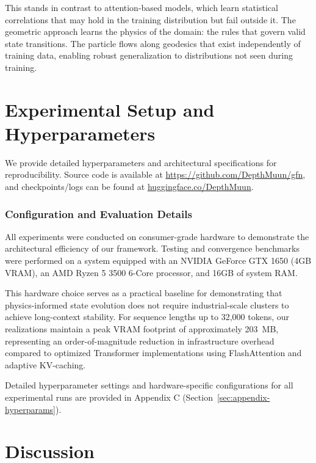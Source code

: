 \documentclass[12pt,a4paper]{article}
\begin{document}
This stands in contrast to attention-based models, which learn statistical correlations that may hold in the training distribution but fail outside it. The geometric approach learns the physics of the domain: the rules that govern valid state transitions. The particle flows along geodesics that exist independently of training data, enabling robust generalization to distributions not seen during training.

\section{Experimental Setup and Hyperparameters}
\label{sec:experimental-setup}

We provide detailed hyperparameters and architectural specifications for reproducibility. Source code is available at \url{https://github.com/DepthMuun/gfn}, and checkpoints/logs can be found at \href{https://huggingface.co/DepthMuun}{huggingface.co/DepthMuun}.

\subsubsection{Configuration and Evaluation Details}
\label{sec:hardware-details}

All experiments were conducted on consumer-grade hardware to demonstrate the architectural efficiency of our framework. Testing and convergence benchmarks were performed on a system equipped with an NVIDIA GeForce GTX 1650 (4GB VRAM), an AMD Ryzen 5 3500 6-Core processor, and 16GB of system RAM.

This hardware choice serves as a practical baseline for demonstrating that physics-informed state evolution does not require industrial-scale clusters to achieve long-context stability. For sequence lengths up to 32,000 tokens, our realizations maintain a peak VRAM footprint of approximately 203~MB, representing an order-of-magnitude reduction in infrastructure overhead compared to optimized Transformer implementations using FlashAttention and adaptive KV-caching.

Detailed hyperparameter settings and hardware-specific configurations for all experimental runs are provided in Appendix C (Section~\ref{sec:appendix-hyperparams}).

\section{Discussion}
\label{sec:discussion}
\end{document}
